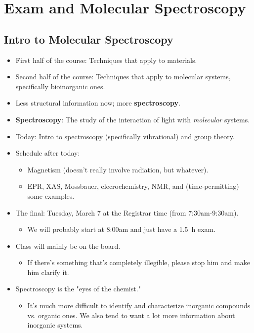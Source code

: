 \documentclass[../notes.tex]{subfiles}
\begin{document}
\chapter{Exam and Molecular Spectroscopy}
\section{Intro to Molecular Spectroscopy}
\begin{itemize}
    \item {}First half of the course: Techniques that apply to materials.
    \item Second half of the course: Techniques that apply to molecular systems, specifically bioinorganic ones.
    \item Less structural information now; more \textbf{spectroscopy}.
    \item \textbf{Spectroscopy}: The study of the interaction of light with \emph{molecular} systems.
    \item Today: Intro to spectroscopy (specifically vibrational) and group theory.
    \item Schedule after today:
    \begin{itemize}
        \item Magnetism (doesn't really involve radiation, but whatever).
        \item EPR, XAS, Mossbauer, elecrochemistry, NMR, and (time-permitting) some examples.
    \end{itemize}
    \item The final: Tuesday, March 7 at the Registrar time (from 7:30am-9:30am).
    \begin{itemize}
        \item We will probably start at 8:00am and just have a \SI{1.5}{\hour} exam.
    \end{itemize}
    \item Class will mainly be on the board.
    \begin{itemize}
        \item If there's something that's completely illegible, please stop him and make him clarify it.
    \end{itemize}
    \item Spectroscopy is the "eyes of the chemist."
    \begin{itemize}
        \item It's much more difficult to identify and characterize inorganic compounds vs. organic ones. We also tend to want a lot more information about inorganic systems.

\end{itemize}
\end{itemize}
\end{document}
